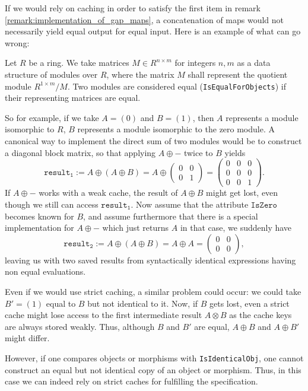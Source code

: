 \begin{example}
 If we would rely on caching in order to satisfy the first item in remark \ref{remark:implementation_of_gap_maps},
 a concatenation of \GAP maps would not necessarily yield equal output for equal input.
 Here is an example of what can go wrong:
 
 Let $R$ be a ring. We take matrices $M \in R^{n \times m}$ for integers $n,m$ as a data structure of
 modules over $R$, where the matrix $M$ shall represent the quotient module $R^{ 1 \times m }/ M$.
 Two modules are considered equal (\texttt{IsEqualForObjects}) if their representing matrices are equal.
 
 So for example, if we take $A = ( 0 )$ and $B = ( 1 )$, then $A$ represents a module isomorphic to $R$, 
 $B$ represents a module isomorphic to the zero module.
 A canonical way to implement the direct sum of two modules would be to construct a diagonal block matrix,
 so that applying $A \oplus -$ twice to $B$ yields
 \[
  \mathtt{result_1 := }
  A \oplus( A \oplus B ) =
  A \oplus
  \begin{pmatrix}
   0 & 0 \\
   0 & 1
  \end{pmatrix} =
  \begin{pmatrix}
   0 & 0 & 0 \\
   0 & 0 & 0 \\
   0 & 0 & 1
  \end{pmatrix}.
 \]
 If $A \oplus - $ works with a weak cache, the result of $A \oplus B$ might get lost, even though we still can access $\mathtt{result_1}$.
 Now assume that the attribute $\texttt{IsZero}$ becomes known for $B$, and assume furthermore that there is a special implementation
 for $A \oplus -$ which just returns $A$ in that case, we suddenly have
 \[
  \mathtt{result_2 := }
  A \oplus( A \oplus B ) =
  A \oplus A =
  \begin{pmatrix}
   0 & 0 \\
   0 & 0 
  \end{pmatrix},
 \]
 leaving us with two saved results from syntactically identical expressions
 having non equal evaluations.

 Even if we would use strict caching, a similar problem could occur: we could take $B' = ( 1 )$ equal to $B$ but not identical to it.
 Now, if $B$ gets lost, even a strict cache might lose access to the first intermediate result $A \otimes B$ as the cache keys are always stored weakly.
 Thus, although $B$ and $B'$ are equal, $A \oplus B$ and $A \oplus B'$ might differ.

 However, if one compares objects or morphisms with \texttt{IsIdenticalObj}, one cannot construct an equal but not identical copy of an object or morphism. Thus,
 in this case we can indeed rely on strict caches for fulfilling the specification.
\end{example}


